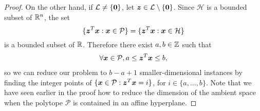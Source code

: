 \begin{proof}
On the other hand, if
${\mathcal{L}} \neq \lbrace \boldsymbol{0} \rbrace$, let
$\boldsymbol{z} \in {\mathcal{L}} \setminus \lbrace \boldsymbol{0}
\rbrace$.
Since $\mathcal{H}$ is a bounded subset of $\mathbb{R}^n$, the set
\[ \lbrace \boldsymbol{z}^T\boldsymbol{x} : \boldsymbol{x}\in \mathcal{P} \rbrace =
   \lbrace \boldsymbol{z}^T\boldsymbol{x} : \boldsymbol{x}\in \mathcal{H} \rbrace \]
is a bounded subset of $\mathbb{R}$.
Therefore there exist
$a,b \in \mathbb{Z}$ such that
\begin{align*}
\forall \boldsymbol{x} \in \mathcal{P}, a \leq \boldsymbol{z}^{T} \boldsymbol{x} \leq b ,
\end{align*}
so we can reduce our problem to $b-a+1$ smaller-dimensional instances
by finding the integer points of
$\lbrace \boldsymbol{x} \in \mathcal{P} :
\boldsymbol{z}^{T} \boldsymbol{x} = i \rbrace$,
for $i \in \lbrace a, \ldots, b \rbrace$. Note that we have seen
earlier in the proof how to reduce the dimension of the ambient space
when the polytope $\mathcal{P}$ is contained in an affine
hyperplane.
\end{proof}

